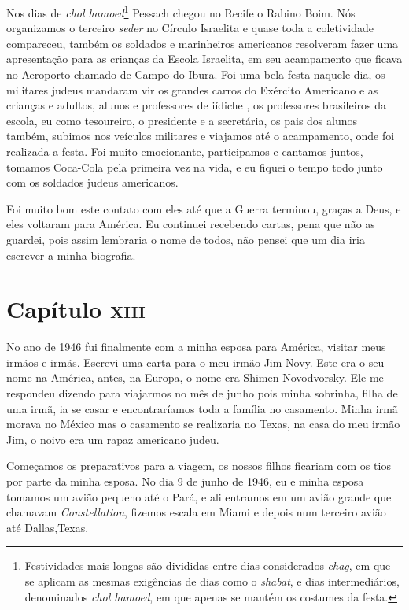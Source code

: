 Nos dias de \textit{chol hamoed}\footnote{Festividades mais longas são divididas
  entre dias considerados \textit{chag}, em que se aplicam as mesmas exigências
  de dias como o \textit{shabat}, e dias intermediários, denominados \textit{chol hamoed},
  em que apenas se mantém os costumes da festa.} Pessach chegou no
Recife o Rabino Boim. Nós organizamos o terceiro \textit{seder} no Círculo
Israelita e quase toda a coletividade compareceu, também os soldados e
marinheiros americanos resolveram fazer uma apresentação para as
crianças da Escola Israelita, em seu acampamento que ficava no Aeroporto
chamado de Campo do Ibura. Foi uma bela festa naquele dia, os militares
judeus mandaram vir os grandes carros do Exército Americano e as
crianças e adultos, alunos e professores de iídiche , os professores
brasileiros da escola, eu como tesoureiro, o presidente e a secretária,
os pais dos alunos também, subimos nos veículos militares e viajamos até
o acampamento, onde foi realizada a festa. Foi muito emocionante,
participamos e cantamos juntos, tomamos Coca-Cola pela primeira vez na
vida, e eu fiquei o tempo todo junto com os soldados judeus americanos.

Foi muito bom este contato com eles até que a Guerra terminou, graças a
Deus, e eles voltaram para América. Eu continuei recebendo cartas, pena
que não as guardei, pois assim lembraria o nome de todos, não pensei que
um dia iria escrever a minha biografia.

\chapter{Capítulo \textsc{xiii}}

No ano de 1946 fui finalmente com a minha esposa para América, visitar
meus irmãos e irmãs. Escrevi uma carta para o meu irmão Jim Novy. Este
era o seu nome na América, antes, na Europa, o nome era Shimen
Novodvorsky. Ele me respondeu dizendo para viajarmos no mês de junho
pois minha sobrinha, filha de uma irmã, ia se casar e encontraríamos
toda a família no casamento. Minha irmã morava no México mas o casamento
se realizaria no Texas, na casa do meu irmão Jim, o noivo era um rapaz
americano judeu.

Começamos os preparativos para a viagem, os nossos filhos ficariam com
os tios por parte da minha esposa. No dia 9 de junho de 1946, eu e minha
esposa tomamos um avião pequeno até o Pará, e ali entramos em um avião
grande que chamavam \textit{Constellation}, fizemos escala em Miami e depois num
terceiro avião até Dallas,Texas.

